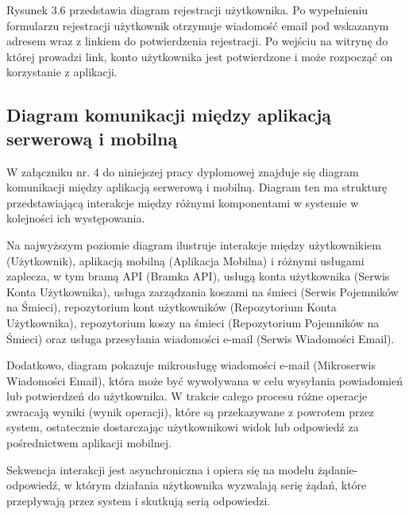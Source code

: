 \documentclass[12pt, a4paper, twoside, openany]{book}
\newcommand{\forceindent}{\leavevmode{\parindent=1.3em\indent}}
\begin{document}
Rysunek 3.6 przedstawia diagram rejestracji użytkownika. Po wypełnieniu formularzu rejestracji użytkownik otrzymuje wiadomość email pod wskazanym adresem wraz z linkiem do potwierdzenia rejestracji. Po wejściu na witrynę do której prowadzi link, konto użytkownika jest potwierdzone i może rozpocząć on korzystanie z aplikacji.


\subsection{Diagram komunikacji między aplikacją serwerową i mobilną}

\forceindent W załączniku nr. 4 do niniejszej pracy dyplomowej znajduje się diagram komunikacji między aplikacją serwerową i mobilną.
Diagram ten ma strukturę przedstawiającą interakcje między różnymi komponentami w systemie w kolejności ich występowania.

Na najwyższym poziomie diagram ilustruje interakcje między użytkownikiem (Użytkownik), aplikacją mobilną (Aplikacja Mobilna) i różnymi usługami zaplecza, w tym bramą API (Bramka API), usługą konta użytkownika (Serwis Konta Użytkownika), usługa zarządzania koszami na śmieci (Serwis Pojemników na Śmieci), repozytorium kont użytkowników (Repozytorium Konta Użytkownika), repozytorium koszy na śmieci (Repozytorium Pojemników na Śmieci) oraz usługa przesyłania wiadomości e-mail (Serwis Wiadomości Email).

Dodatkowo, diagram pokazuje mikrousługę wiadomości e-mail (Mikroserwis Wiadomości Email), która może być wywoływana w celu wysyłania powiadomień lub potwierdzeń do użytkownika. W trakcie całego procesu różne operacje zwracają wyniki (wynik operacji), które są przekazywane z powrotem przez system, ostatecznie dostarczając użytkownikowi widok lub odpowiedź za pośrednictwem aplikacji mobilnej.

Sekwencja interakcji jest asynchroniczna i opiera się na modelu żądanie-odpowiedź, w którym działania użytkownika wyzwalają serię żądań, które przepływają przez system i skutkują serią odpowiedzi.
\end{document}
